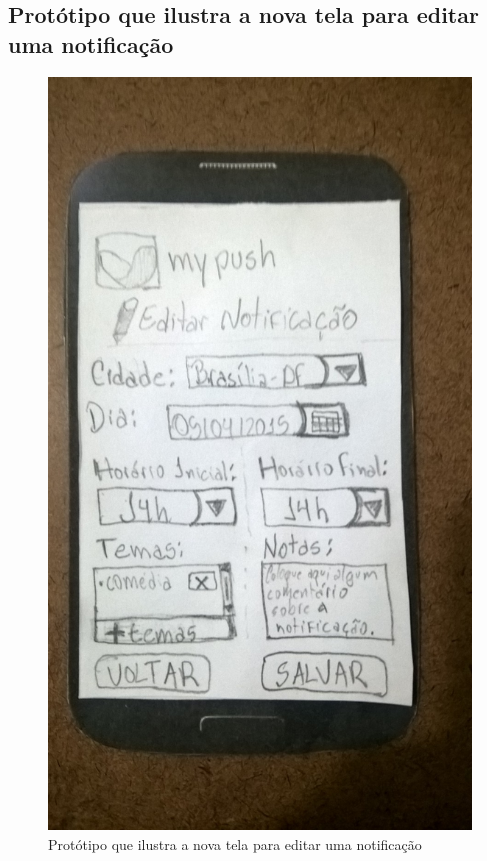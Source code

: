 \begin{apendicesenv}
  \pagebreak
  \section*{Protótipo que ilustra a nova tela para editar uma notificação}

    \begin{figure}[!htbp]
      \centering
      \includegraphics[scale=0.32, angle=-90]{editaveis/figuras/prototipo_papel_v2/editar_notificacao}
      \caption{Protótipo que ilustra a nova tela para editar uma notificação}
      \label{editar_notificacao_v2}
    \end{figure}
  

\end{apendicesenv}
